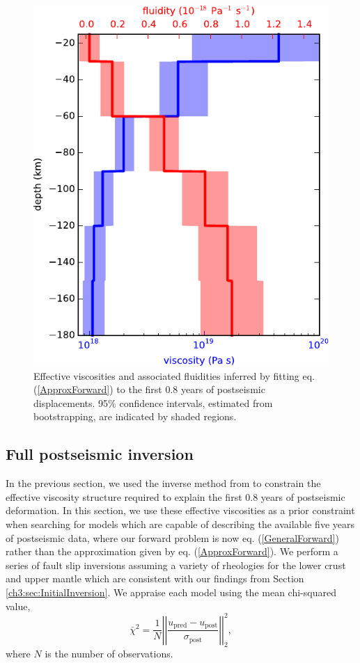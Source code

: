 \begin{figure}
\includegraphics[scale=1.0]{ch3/figures/2016jb013114-p12}
\caption{Effective viscosities and associated fluidities inferred by
fitting eq. (\ref{ApproxForward}) to the first 0.8 years of
postseismic displacements. 95\% confidence intervals, estimated from
bootstrapping, are indicated by shaded regions.}
\label{ch3:fig:EffectiveViscosity}
\end{figure} 

\subsection{Full postseismic inversion}\label{ch3:sec:FullInversion} 
In the previous section, we used the inverse method from
\citet{Hines2016} to constrain the effective viscosity structure
required to explain the first 0.8 years of postseismic deformation. In
this section, we use these effective viscosities as a prior constraint
when searching for models which are capable of describing the
available five years of postseismic data, where our forward problem is
now eq. (\ref{GeneralForward}) rather than the approximation given by
eq. (\ref{ApproxForward}).  We perform a series of fault slip
inversions assuming a variety of rheologies for the lower crust and
upper mantle which are consistent with our findings from Section
\ref{ch3:sec:InitialInversion}.  We appraise each model using the mean
chi-squared value,
\begin{equation}\label{ch3:eq:Misfit}
  \bar\chi^2 = \frac{1}{N}\left|\left|\frac{u_\mathrm{pred} - u_\mathrm{post}}{\sigma_\mathrm{post}}\right|\right|_2^2,
\end{equation}
where $N$ is the number of observations.

